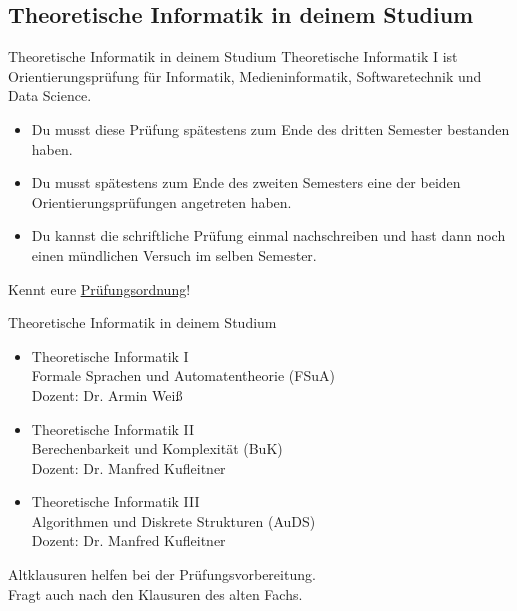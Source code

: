 \subsection{Theoretische Informatik in deinem Studium}
\begin{frame}[fragile]{Theoretische Informatik in deinem Studium}
Theoretische Informatik I ist Orientierungsprüfung für Informatik, Medieninformatik, Softwaretechnik und Data Science.
    \begin{itemize} 
    \item Du musst diese Prüfung spätestens zum Ende des dritten Semester bestanden haben.
    \item Du musst spätestens zum Ende des zweiten Semesters eine der beiden Orientierungsprüfungen angetreten haben.
    \item Du kannst die schriftliche Prüfung einmal nachschreiben und hast dann noch einen mündlichen Versuch im selben Semester.
    \end{itemize}
    \alert{Kennt eure \href{https://www.student.uni-stuttgart.de/pruefungsorganisation/pruefungsordnung/}{\underline{Prüfungsordnung}}!}
\end{frame}

\begin{frame}{Theoretische Informatik in deinem Studium}
    \begin{itemize}
        \item Theoretische Informatik I\\
        Formale Sprachen und Automatentheorie (FSuA)\\
        \quad Dozent: Dr. Armin Weiß
        \item Theoretische Informatik II\\
        Berechenbarkeit und Komplexität (BuK)\\
        \quad Dozent: Dr. Manfred Kufleitner
        \item Theoretische Informatik III\\
        Algorithmen und Diskrete Strukturen (AuDS)\\
        \quad Dozent: Dr. Manfred Kufleitner
    \end{itemize}
	\alert{Altklausuren helfen bei der Prüfungsvorbereitung. \\Fragt auch nach den Klausuren des alten Fachs.}
\end{frame}

